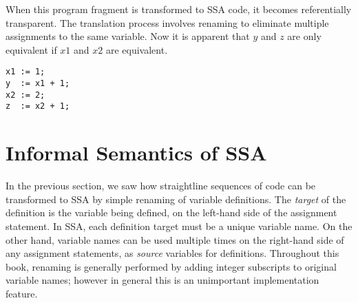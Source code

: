 When this program fragment is transformed to SSA code,
it becomes referentially transparent. The translation process
involves renaming to  
eliminate multiple assignments to the same variable. Now it is
apparent that $y$ and $z$ are only equivalent if $x1$ and $x2$
are equivalent.
\begin{verbatim}
x1 := 1;
y  := x1 + 1;
x2 := 2;
z  := x2 + 1;
\end{verbatim}







\section{Informal Semantics of SSA}



In the previous section, we saw how straightline sequences of code
can be transformed to SSA by simple renaming of variable definitions.
The \textit{target} of the definition is the variable being defined, on the
left-hand side of the assignment statement.
In SSA, each definition target must be a unique variable name.
On the other hand, variable names can be used multiple times
on the right-hand side of any assignment statements, as 
\textit{source} variables for definitions.
Throughout this book, renaming is generally performed by 
adding integer subscripts to original variable names;
however in general this is an unimportant implementation feature.


